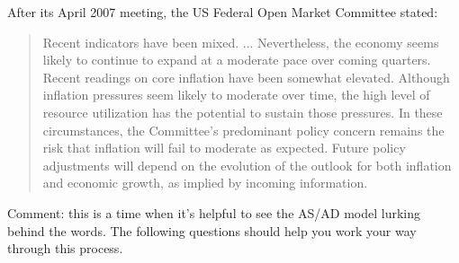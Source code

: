 \documentclass[letterpaper,12pt]{exam}
\begin{document}
\begin{questions}
After its April 2007 meeting,
the US Federal Open Market Committee stated:
%
\begin{quote}
Recent indicators have been mixed. ...
Nevertheless, the economy seems likely to continue
to expand at a moderate pace over coming quarters.
%
Recent readings on core inflation have been somewhat elevated.
Although inflation pressures seem likely to moderate over time,
the high level of resource utilization has the potential
to sustain those pressures.
%
In these circumstances, the Committee's predominant policy concern remains the risk that inflation will fail to moderate as expected. Future policy adjustments will depend on the evolution of the outlook for both inflation and economic growth, as implied by incoming information.
\end{quote}
%
Comment:  this is a time when it's helpful to
see the AS/AD model lurking behind the words.
The following questions should help you work your
way through this process.
%

\begin{solution}
\begin{parts}

\end{parts}
\end{solution}
\end{questions}
\end{document}
